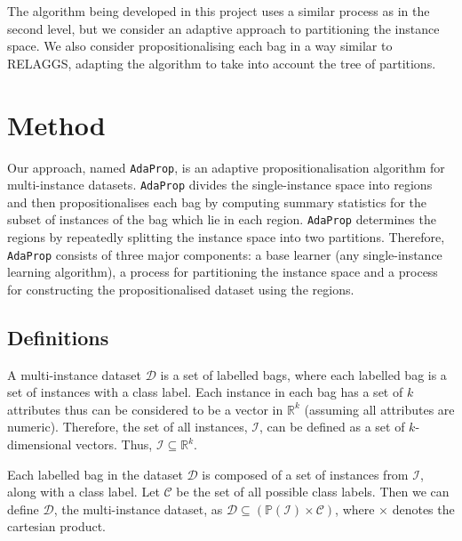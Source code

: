 \documentclass[a4paper,12pt]{report} %
\newcommand{\AdaProp}{\texttt{AdaProp}\xspace}
\newcommand{\real}{\mathbb{R}}
\newcommand{\mcl}[1]{\mathcal{#1}}
\newcommand{\power}{\mathbb{P}}
\begin{document}
The algorithm being developed in this project uses a similar process 
    as  in the second level, 
    but we consider an adaptive approach to partitioning the instance space.
We also consider propositionalising each bag in a way similar to 
    RELAGGS, adapting the algorithm to take into account the tree of partitions.












\chapter{Method}

Our approach, named \AdaProp, is an adaptive propositionalisation algorithm 
    for multi-instance datasets.
\AdaProp divides the single-instance space
    into regions and then propositionalises each bag 
    by computing summary statistics for the 
    subset of instances of the bag which lie in each region.
\AdaProp determines the regions by repeatedly splitting the instance space into 
    two partitions.
Therefore, \AdaProp consists of three major components: 
    a base learner (any single-instance learning algorithm),
    a process for partitioning the instance space and 
    a process for constructing the propositionalised dataset using the regions.

\section{Definitions}
A multi-instance dataset $\mcl{D}$ is a set of labelled bags, 
    where each labelled bag is a set of instances with a class label.
Each instance in each bag has a set of $k$ attributes
    thus can be considered to be a vector in $\real^k$
    (assuming all attributes are numeric).
Therefore, the set of all instances, $\mcl{I}$,
    can be defined as a set of $k$-dimensional vectors.
Thus, $ \mcl{I} \subseteq \real^k $.

Each labelled bag in the dataset $\mcl{D}$ is 
    composed of a set of instances from $\mcl{I}$,
    along with a class label. %
Let $\mcl{C}$ be the set of all possible class labels.
Then we can define $\mcl{D}$,
    the multi-instance dataset, as 
    $\mcl{D} \subseteq ( \power (\mcl{I}) \times \mcl{C} )$,
    where $\times$ denotes the cartesian product.
\end{document}
